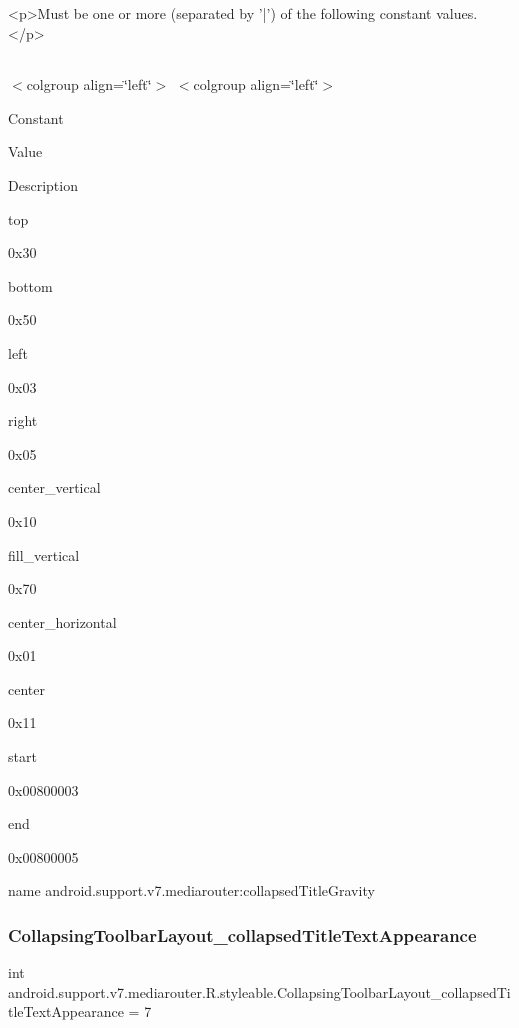 \begin{DoxyVerb}      <p>Must be one or more (separated by '|') of the following constant values.</p>
\end{DoxyVerb}
 \tabulinesep=1mm
\begin{longtabu} spread 0pt [c]{*{0}{|X[-1]}|}
\hline
\end{longtabu}
$<$colgroup align=\char`\"{}left\char`\"{}$>$ $<$colgroup align=\char`\"{}left\char`\"{}$>$ 

Constant

Value

Description 

{\ttfamily top}

0x30

{\ttfamily bottom}

0x50

{\ttfamily left}

0x03

{\ttfamily right}

0x05

{\ttfamily center\+\_\+vertical}

0x10

{\ttfamily fill\+\_\+vertical}

0x70

{\ttfamily center\+\_\+horizontal}

0x01

{\ttfamily center}

0x11

{\ttfamily start}

0x00800003

{\ttfamily end}

0x00800005

name android.\+support.\+v7.\+mediarouter\+:collapsed\+Title\+Gravity \mbox{\label{classandroid_1_1support_1_1v7_1_1mediarouter_1_1R_1_1styleable_a19289097d1a4df77e8a7e6951eca7f63}} 
\subsubsection{\texorpdfstring{Collapsing\+Toolbar\+Layout\+\_\+collapsed\+Title\+Text\+Appearance}{CollapsingToolbarLayout\_collapsedTitleTextAppearance}}
{\footnotesize\ttfamily int android.\+support.\+v7.\+mediarouter.\+R.\+styleable.\+Collapsing\+Toolbar\+Layout\+\_\+collapsed\+Title\+Text\+Appearance = 7\hspace{0.3cm}{\ttfamily [static]}}

